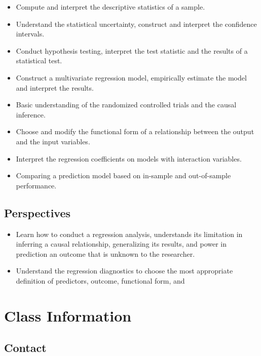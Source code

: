 \documentclass[
]{book}
\providecommand{\tightlist}{%
  \setlength{\itemsep}{0pt}\setlength{\parskip}{0pt}}
\begin{document}
\begin{itemize}
\tightlist
\item
  Compute and interpret the descriptive statistics of a sample.
\item
  Understand the statistical uncertainty, construct and interpret the confidence intervals.
\item
  Conduct hypothesis testing, interpret the test statistic and the results of a statistical test.
\item
  Construct a multivariate regression model, empirically estimate the model and interpret the results.
\item
  Basic understanding of the randomized controlled trials and the causal inference.
\item
  Choose and modify the functional form of a relationship between the output and the input variables.
\item
  Interpret the regression coefficients on models with interaction variables.
\item
  Comparing a prediction model based on in-sample and out-of-sample performance.
\end{itemize}

\hypertarget{perspectives}{%
\subsection*{Perspectives}\label{perspectives}}

\begin{itemize}
\tightlist
\item
  Learn how to conduct a regression analysis, understands its limitation in inferring a causal relationship, generalizing its results, and power in prediction an outcome that is unknown to the researcher.
\item
  Understand the regression diagnostics to choose the most appropriate definition of predictors, outcome, functional form, and
\end{itemize}

\hypertarget{class-information}{%
\section*{Class Information}\label{class-information}}

\hypertarget{contact-information}{%
\subsection*{Contact}\label{contact-information}}
\end{document}
